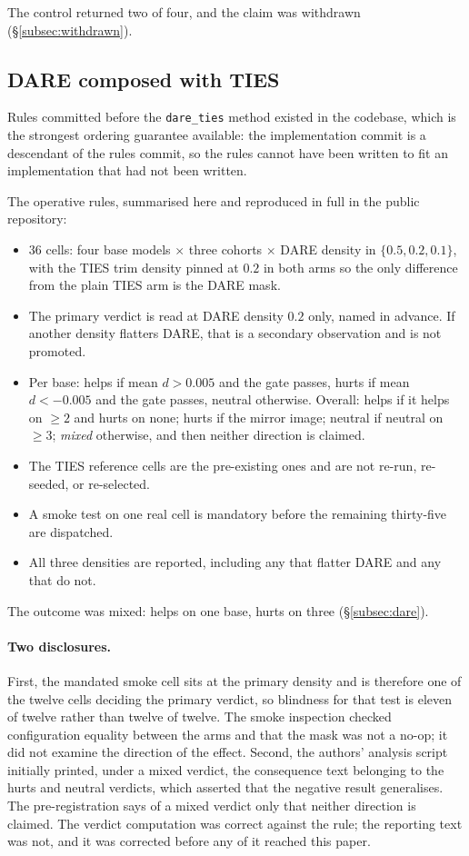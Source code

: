 The control returned two of four, and the claim was withdrawn
(\S\ref{subsec:withdrawn}).

\subsection{DARE composed with TIES}

Rules committed before the \texttt{dare\_ties} method existed in the
codebase, which is the strongest ordering guarantee available: the
implementation commit is a descendant of the rules commit, so the rules
cannot have been written to fit an implementation that had not been
written.

The operative rules, summarised here and reproduced in full in the
public repository:
\begin{itemize}
\item $36$ cells: four base models $\times$ three cohorts $\times$ DARE
  density in $\{0.5, 0.2, 0.1\}$, with the TIES trim density pinned at
  $0.2$ in both arms so the only difference from the plain TIES arm is
  the DARE mask.
\item The primary verdict is read at DARE density $0.2$ only, named in
  advance. If another density flatters DARE, that is a secondary
  observation and is not promoted.
\item Per base: helps if mean $d > 0.005$ and the gate passes, hurts if
  mean $d < -0.005$ and the gate passes, neutral otherwise. Overall:
  helps if it helps on $\geq 2$ and hurts on none; hurts if the mirror
  image; neutral if neutral on $\geq 3$; \emph{mixed} otherwise, and then
  neither direction is claimed.
\item The TIES reference cells are the pre-existing ones and are not
  re-run, re-seeded, or re-selected.
\item A smoke test on one real cell is mandatory before the remaining
  thirty-five are dispatched.
\item All three densities are reported, including any that flatter DARE
  and any that do not.
\end{itemize}

The outcome was mixed: helps on one base, hurts on three
(\S\ref{subsec:dare}).

\paragraph{Two disclosures.} First, the mandated smoke cell sits at the
primary density and is therefore one of the twelve cells deciding the
primary verdict, so blindness for that test is eleven of twelve rather
than twelve of twelve. The smoke inspection checked configuration
equality between the arms and that the mask was not a no-op; it did not
examine the direction of the effect. Second, the authors' analysis script
initially printed, under a mixed verdict, the consequence text belonging
to the hurts and neutral verdicts, which asserted that the negative
result generalises. The pre-registration says of a mixed verdict only
that neither direction is claimed. The verdict computation was correct
against the rule; the reporting text was not, and it was corrected before
any of it reached this paper.

